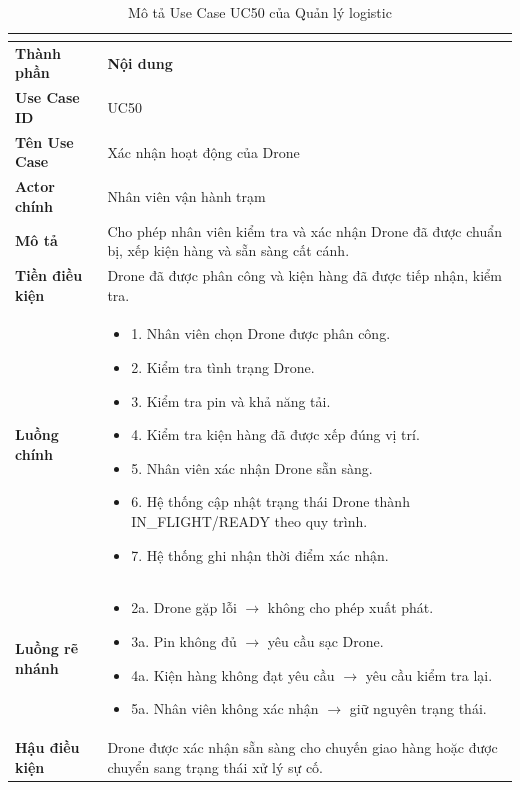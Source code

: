 \begin{longtable}{|C{3cm}|L{11cm}|}
\caption{Mô tả Use Case UC50 của Quản lý logistic}\\
\label{tab:mo-ta-uc50-quan-ly-logistic}\\
\hline
\textbf{Thành phần} & \textbf{Nội dung} \\
\hline
\textbf{Use Case ID} & UC50 \\
\hline
\textbf{Tên Use Case} & Xác nhận hoạt động của Drone \\
\hline
\textbf{Actor chính} & Nhân viên vận hành trạm \\
\hline
\textbf{Mô tả} & Cho phép nhân viên kiểm tra và xác nhận Drone đã được chuẩn bị, xếp kiện hàng và sẵn sàng cất cánh. \\
\hline
\textbf{Tiền điều kiện} & Drone đã được phân công và kiện hàng đã được tiếp nhận, kiểm tra. \\
\hline
\textbf{Luồng chính} &
\begin{itemize}[leftmargin=*,topsep=2pt,itemsep=2pt]
    \item 1. Nhân viên chọn Drone được phân công.
    \item 2. Kiểm tra tình trạng Drone.
    \item 3. Kiểm tra pin và khả năng tải.
    \item 4. Kiểm tra kiện hàng đã được xếp đúng vị trí.
    \item 5. Nhân viên xác nhận Drone sẵn sàng.
    \item 6. Hệ thống cập nhật trạng thái Drone thành IN\_FLIGHT/READY theo quy trình.
    \item 7. Hệ thống ghi nhận thời điểm xác nhận.
\end{itemize} \\
\hline
\textbf{Luồng rẽ nhánh} &
\begin{itemize}[leftmargin=*,topsep=2pt,itemsep=2pt]
    \item 2a. Drone gặp lỗi $\rightarrow$ không cho phép xuất phát.
    \item 3a. Pin không đủ $\rightarrow$ yêu cầu sạc Drone.
    \item 4a. Kiện hàng không đạt yêu cầu $\rightarrow$ yêu cầu kiểm tra lại.
    \item 5a. Nhân viên không xác nhận $\rightarrow$ giữ nguyên trạng thái.
\end{itemize} \\
\hline
\textbf{Hậu điều kiện} & Drone được xác nhận sẵn sàng cho chuyến giao hàng hoặc được chuyển sang trạng thái xử lý sự cố. \\
\hline
\end{longtable}



